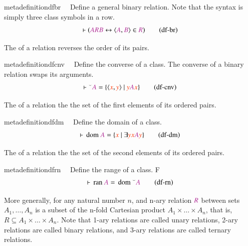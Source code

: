 \begin{restatable}{metadefinition}{dfbr}~~ Define a general binary relation.  Note
that the syntax is simply three
     class symbols in a row.  
\begin{align}
\vdash ( \mc{A} \mc{R} \mc{B} \leftrightarrow \langle \mc{A} , \mc{B} \rangle
    \in \mc{R} )\label{eq:df-br}\tag{df-br}
\end{align}
\end{restatable}


\pn The  of a relation reverses the order of its pairs.
\begin{restatable}{metadefinition}{dfcnv}~~ Define the converse of a class. 
The converse of a binary relation swaps its arguments.
\begin{align}
\vdash {}^{\smallsmile} \mc{A} = \{ \langle \msc{x} , \msc{y} \rangle~\vert~\msc{y}
    \mc{A} \msc{x} \}\label{eq:df-cnv}\tag{df-cnv}
\end{align}
\end{restatable}


\pn The  of a relation the the set of the first elements of its ordered pairs.
\begin{restatable}{metadefinition}{dfdm}~~ Define the domain of a class.  
\begin{align}
\vdash \,\mathrm{dom}~ \mc{A} = \{ \msc{x}~\vert~\exists \msc{y} \msc{x} \mc{A}
    \msc{y} \}\label{eq:df-dm}\tag{df-dm}
\end{align}
\end{restatable}

\pn The  of a relation the the set of the second elements of its ordered pairs.
\begin{restatable}{metadefinition}{dfrn}~~ Define the range of a class.  F
\begin{align}
\vdash \,\mathrm{ran}~ \mc{A} = \,\mathrm{dom}~ {}^{\smallsmile}
    \mc{A}\label{eq:df-rn}\tag{df-rn}
\end{align}
\end{restatable}


\pn More generally, for any natural number $n$, and n-ary relation $\mc{R}$ between sets $A_1,\ldots,A_n$ is a subset of the n-fold Cartesian product $A_1\times\ldots\times A_n$, that is, 
$R\subseteq A_1\times\ldots\times A_n$.  Note that 1-ary relations are called unary relations, 2-ary relations are called binary relations, and 3-ary relations are called ternary relations.


